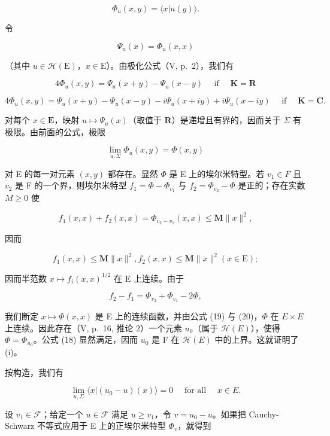 \[
\Phi_ {u} (x, y) = \langle x | u (y) \rangle .
\]

令

\[
\Psi_ {u} (x) = \Phi_ {u} (x, x)
\]

（其中 \(u \in \mathcal{H}(\mathrm{E})\)，\(x \in \mathrm{E}\)）。由极化公式（V, p.~2），我们有

\[
4 \Phi_ {u} (x, y) = \Psi_ {u} (x + y) - \Psi_ {u} (x - y) \quad \text { if } \quad \mathbf {K} = \mathbf {R}\tag{19}
\]

\[
4 \Phi_ {u} (x, y) = \Psi_ {u} (x + y) - \Psi_ {u} (x - y) - i \Psi_ {u} (x + i y) + i \Psi_ {u} (x - i y) \quad \text { if } \quad \mathbf {K} = \mathbf {C}.\tag{20}
\]

对每个 \(x \in \mathbf{E}\)，映射 \(u \mapsto \Psi_u(x)\)（取值于 \(\mathbf{R}\)）是递增且有界的，因而关于 \(\Sigma\) 有极限。由前面的公式，极限

\[
\lim _ {u, \Sigma} \Phi_ {u} (x, y) = \Phi (x, y)
\]

对 E 的每一对元素 \((x, y)\) 都存在。显然 \(\Phi\) 是 E 上的埃尔米特型。若 \(v_{1} \in F\) 且 \(v_{2}\) 是 F 的一个界，则埃尔米特型 \(f_{1} = \Phi - \Phi_{v_{1}}\) 与 \(f_{2} = \Phi_{v_{2}} - \Phi\) 是正的；存在实数 \(M \geqslant 0\) 使

\[
f _ {1} (x, x) + f _ {2} (x, x) = \Phi_ {v _ {2} - v _ {1}} (x, x) \leqslant \mathbf {M} \| x \| ^ {2},
\]

因而

\[
f _ {1} (x, x) \leqslant \mathbf {M} \| x \| ^ {2}, f _ {2} (x, x) \leqslant \mathbf {M} \| x \| ^ {2} (x \in \mathrm{E});
\]

因而半范数 \(x \mapsto f_i(x, x)^{1/2}\) 在 E 上连续。由于

\[
f _ {2} - f _ {1} = \Phi_ {v _ {2}} + \Phi_ {v _ {1}} - 2 \Phi ,
\]

我们断定 \(x \mapsto \Phi(x, x)\) 是 E 上的连续函数，并由公式 (19) 与 (20)，\(\Phi\) 在 \(E \times E\) 上连续。因此存在（V, p.~16, 推论 2）一个元素 \(u_{0}\)（属于 \(\mathcal{H}(E)\)），使得 \(\Phi = \Phi_{u_{0}}\)。公式 (18) 显然满足，因而 \(u_{0}\) 是 F 在 \(\mathcal{H}(E)\) 中的上界。这就证明了 (i)。

按构造，我们有

\[
\lim _ {u, \Sigma} \langle x | (u _ {0} - u) (x) \rangle = 0 \quad \text { for   all } \quad x \in E.\tag{21}
\]

设 \(v_{1} \in \mathcal{F}\)；给定一个 \(u \in \mathcal{F}\) 满足 \(u \geqslant v_{1}\)，令 \(v = u_{0} - u\)。如果把 Cauchy-Schwarz 不等式应用于 E 上的正埃尔米特型 \(\Phi_v\)，就得到

